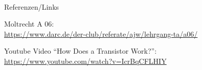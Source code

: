 \renewcommand{\refname}{Referenzen}

\hypertarget{refs}{}
\textcolor{white}{} \\ %
\Large Referenzen/Links
\footnotesize

\begin{thebibliography}{}
     Moltrecht A 06: \\
    \url{https://www.darc.de/der-club/referate/ajw/lehrgang-ta/a06/}

      Youtube Video “How Does a Transistor Work?”:
    \url{https://www.youtube.com/watch?v=IcrBqCFLHIY}
\end{thebibliography}


